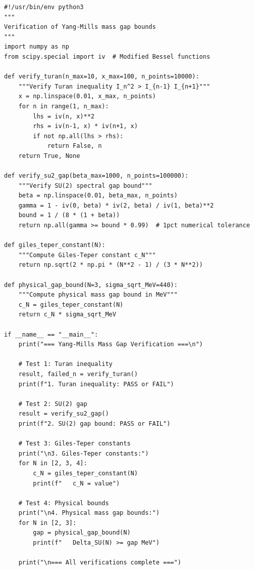 \begin{verbatim}
#!/usr/bin/env python3
"""
Verification of Yang-Mills mass gap bounds
"""
import numpy as np
from scipy.special import iv  # Modified Bessel functions

def verify_turan(n_max=10, x_max=100, n_points=10000):
    """Verify Turan inequality I_n^2 > I_{n-1} I_{n+1}"""
    x = np.linspace(0.01, x_max, n_points)
    for n in range(1, n_max):
        lhs = iv(n, x)**2
        rhs = iv(n-1, x) * iv(n+1, x)
        if not np.all(lhs > rhs):
            return False, n
    return True, None

def verify_su2_gap(beta_max=1000, n_points=100000):
    """Verify SU(2) spectral gap bound"""
    beta = np.linspace(0.01, beta_max, n_points)
    gamma = 1 - iv(0, beta) * iv(2, beta) / iv(1, beta)**2
    bound = 1 / (8 * (1 + beta))
    return np.all(gamma >= bound * 0.99)  # 1pct numerical tolerance

def giles_teper_constant(N):
    """Compute Giles-Teper constant c_N"""
    return np.sqrt(2 * np.pi * (N**2 - 1) / (3 * N**2))

def physical_gap_bound(N=3, sigma_sqrt_MeV=440):
    """Compute physical mass gap bound in MeV"""
    c_N = giles_teper_constant(N)
    return c_N * sigma_sqrt_MeV

if __name__ == "__main__":
    print("=== Yang-Mills Mass Gap Verification ===\n")
    
    # Test 1: Turan inequality
    result, failed_n = verify_turan()
    print(f"1. Turan inequality: PASS or FAIL")
    
    # Test 2: SU(2) gap
    result = verify_su2_gap()
    print(f"2. SU(2) gap bound: PASS or FAIL")
    
    # Test 3: Giles-Teper constants
    print("\n3. Giles-Teper constants:")
    for N in [2, 3, 4]:
        c_N = giles_teper_constant(N)
        print(f"   c_N = value")
    
    # Test 4: Physical bounds
    print("\n4. Physical mass gap bounds:")
    for N in [2, 3]:
        gap = physical_gap_bound(N)
        print(f"   Delta_SU(N) >= gap MeV")
    
    print("\n=== All verifications complete ===")
\end{verbatim}

